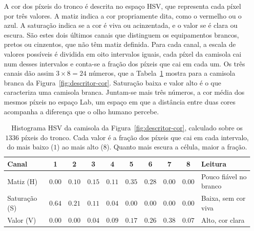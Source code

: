 A cor dos píxeis do tronco é descrita no espaço HSV, que representa cada píxel por três valores. A matiz indica a cor propriamente dita, como o vermelho ou o azul. A saturação indica se a cor é viva ou acinzentada, e o valor se é clara ou escura. São estes dois últimos canais que distinguem os equipamentos brancos, pretos ou cinzentos, que não têm matiz definida. Para cada canal, a escala de valores possíveis é dividida em oito intervalos iguais, cada píxel da camisola cai num desses intervalos e conta-se a fração dos píxeis que cai em cada um. Os três canais dão assim $3 \times 8 = 24$ números, que a Tabela~\ref{tab:hsv-exemplo} mostra para a camisola branca da Figura~\ref{fig:descritor-cor}. Saturação baixa e valor alto é o que caracteriza uma camisola branca. Juntam-se mais três números, a cor média dos mesmos píxeis no espaço Lab, um espaço em que a distância entre duas cores acompanha a diferença que o olho humano percebe.

\begin{table}[H]
    \centering
    \caption{Histograma HSV da camisola da Figura~\ref{fig:descritor-cor}, calculado sobre os $1336$ píxeis do tronco. Cada valor é a fração dos píxeis que cai em cada intervalo, do mais baixo ($1$) ao mais alto ($8$). Quanto mais escura a célula, maior a fração.}
    \label{tab:hsv-exemplo}
    \small
    \setlength{\tabcolsep}{4pt}
    \begin{tabular}{|l|c|c|c|c|c|c|c|c|l|}
        \hline
        \textbf{Canal} & \textbf{1} & \textbf{2} & \textbf{3} & \textbf{4} & \textbf{5} & \textbf{6} & \textbf{7} & \textbf{8} & \textbf{Leitura} \\
        \hline
        Matiz (H) & $0.00$ & \cellcolor{azultab!9}$0.10$ & \cellcolor{azultab!13}$0.15$ & \cellcolor{azultab!9}$0.11$ & \cellcolor{azultab!30}$0.35$ & \cellcolor{azultab!24}$0.28$ & $0.00$ & $0.00$ & Pouco fiável no branco \\
        \hline
        Saturação (S) & \cellcolor{azultab!55}$0.64$ & \cellcolor{azultab!18}$0.21$ & \cellcolor{azultab!9}$0.11$ & \cellcolor{azultab!3}$0.04$ & $0.00$ & $0.00$ & $0.00$ & $0.00$ & Baixa, sem cor viva \\
        \hline
        Valor (V) & $0.00$ & $0.00$ & \cellcolor{azultab!3}$0.04$ & \cellcolor{azultab!8}$0.09$ & \cellcolor{azultab!15}$0.17$ & \cellcolor{azultab!22}$0.26$ & \cellcolor{azultab!33}$0.38$ & \cellcolor{azultab!6}$0.07$ & Alto, cor clara \\
        \hline
    \end{tabular}
\end{table}

